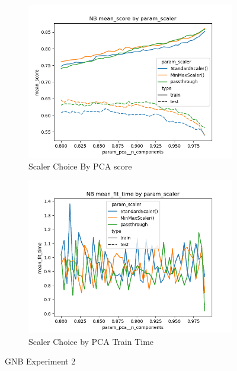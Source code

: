 \documentclass[12pt]{article}
\begin{document}
\begin{figure}
    \begin{subfigure}{.5\textwidth}
        \includegraphics[width=.95\textwidth]{../../results_Experiment2/nb/param_scaler_mean_score_param_pca__n_components.png}
        \caption{Scaler Choice By PCA score}
        \end{subfigure}%
      \begin{subfigure}{.5\textwidth}
        \includegraphics[width=.95\textwidth]{../../results_Experiment2/nb/param_scaler_mean_fit_time_param_pca__n_components.png}
        \caption{Scaler Choice by PCA Train Time}
      \end{subfigure}
      \caption{GNB Experiment 2}
      \label{figure7}
\end{figure}
\end{document}
